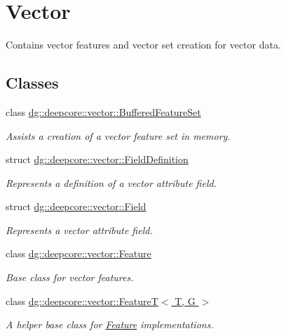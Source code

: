 \hypertarget{group___vector_module}{}\section{Vector}
\label{group___vector_module}


Contains vector features and vector set creation for vector data.  


\subsection*{Classes}
\begin{DoxyCompactItemize}
\item 
class \hyperlink{classdg_1_1deepcore_1_1vector_1_1_buffered_feature_set}{dg\+::deepcore\+::vector\+::\+Buffered\+Feature\+Set}
\begin{DoxyCompactList}\small\item\em Assists a creation of a vector feature set in memory. \end{DoxyCompactList}\item 
struct \hyperlink{structdg_1_1deepcore_1_1vector_1_1_field_definition}{dg\+::deepcore\+::vector\+::\+Field\+Definition}
\begin{DoxyCompactList}\small\item\em Represents a definition of a vector attribute field. \end{DoxyCompactList}\item 
struct \hyperlink{structdg_1_1deepcore_1_1vector_1_1_field}{dg\+::deepcore\+::vector\+::\+Field}
\begin{DoxyCompactList}\small\item\em Represents a vector attribute field. \end{DoxyCompactList}\item 
class \hyperlink{classdg_1_1deepcore_1_1vector_1_1_feature}{dg\+::deepcore\+::vector\+::\+Feature}
\begin{DoxyCompactList}\small\item\em Base class for vector features. \end{DoxyCompactList}\item 
class \hyperlink{structdg_1_1deepcore_1_1vector_1_1_feature_t}{dg\+::deepcore\+::vector\+::\+Feature\+T$<$ T, G $>$}
\begin{DoxyCompactList}\small\item\em A helper base class for \hyperlink{classdg_1_1deepcore_1_1vector_1_1_feature}{Feature} implementations. \end{DoxyCompactList}\item 

\end{DoxyCompactItemize}
